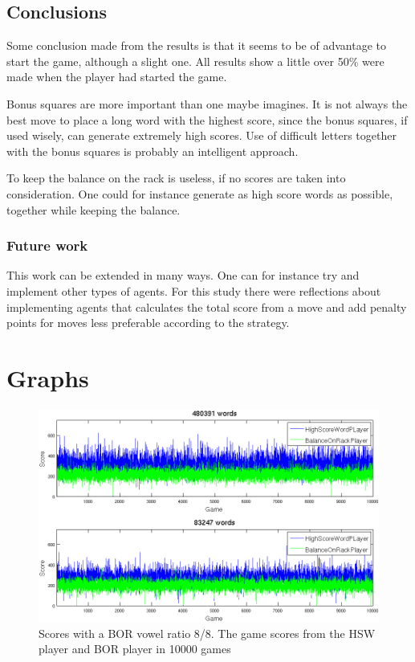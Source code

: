 \documentclass[a4paper, 12pt]{report}
\begin{document}
\section{Conclusions}
Some conclusion made from the results is that it seems to be of advantage to start the game, although a slight one. All results show a little over 50\% were made when the player had started the game.

Bonus squares are more important than one maybe imagines. It is not always the best move to place a long word with the highest score, since the bonus squares, if used wisely, can generate extremely high scores. Use of difficult letters together with the bonus squares is probably an intelligent approach.

To keep the balance on the rack is useless, if no scores are taken into consideration. One could for instance generate as high score words as possible, together while keeping the balance.

\subsection{Future work}
This work can be extended in many ways. One can for instance try and implement other types of agents. For this study there were reflections about implementing agents that calculates the total score from a move and add penalty points for moves less preferable according to the strategy. 

\appendix
\chapter{Graphs}
\begin{figure}[h]
\centering
\includegraphics[scale=0.52]{HighBalance8vow_bothDict_cropped}
\caption {Scores with a BOR vowel ratio 8/8. The game scores from the HSW player and BOR player in 10000 games}
\label{fig:highBalanceBothDict}
\end{figure}
\end{document}
